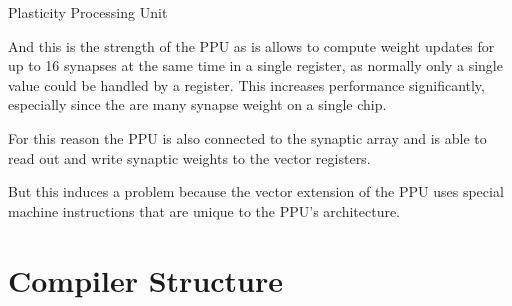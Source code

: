 \documentclass[10pt,aspectratio=169]{beamer}
\begin{document}
\begin{frame}{Plasticity Processing Unit}
{		And this is the strength of the PPU as is allows to compute weight updates for up to 16 synapses at the same time in a single register, as normally only a single value could be handled by a register.
		This increases performance significantly, especially since the are many synapse weight on a single chip. 
		
		For this reason the PPU is also connected to the synaptic array and is able to read out and write synaptic weights to the vector registers.

		But this induces a problem because the vector extension of the PPU uses special machine  instructions that are unique to the PPU's architecture.
}
\end{frame}



\section{Compiler Structure}
\end{document}
